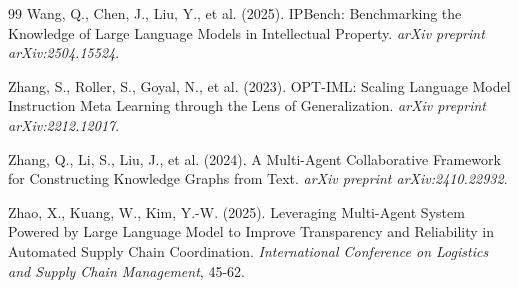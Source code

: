 \documentclass[11pt,a4paper]{article}
\begin{document}
\begin{thebibliography}{99}
Wang, Q., Chen, J., Liu, Y., et al. (2025). 
IPBench: Benchmarking the Knowledge of Large Language Models in Intellectual Property. 
\textit{arXiv preprint arXiv:2504.15524}.

Zhang, S., Roller, S., Goyal, N., et al. (2023). 
OPT-IML: Scaling Language Model Instruction Meta Learning through the Lens of Generalization. 
\textit{arXiv preprint arXiv:2212.12017}.

Zhang, Q., Li, S., Liu, J., et al. (2024). 
A Multi-Agent Collaborative Framework for Constructing Knowledge Graphs from Text. 
\textit{arXiv preprint arXiv:2410.22932}.

Zhao, X., Kuang, W., Kim, Y.-W. (2025). 
Leveraging Multi-Agent System Powered by Large Language Model to Improve Transparency and Reliability in Automated Supply Chain Coordination. 
\textit{International Conference on Logistics and Supply Chain Management}, 45-62.

\end{thebibliography}
\end{document}
